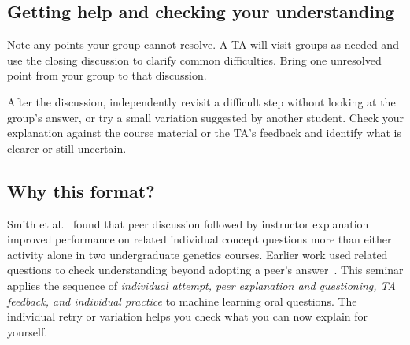 \documentclass[11pt,a4paper]{article}
\begin{document}
\subsection*{Getting help and checking your understanding}
Note any points your group cannot resolve. A TA will visit groups as needed and use the closing discussion to clarify common difficulties. Bring one unresolved point from your group to that discussion.

After the discussion, independently revisit a difficult step without looking at the group's answer, or try a small variation suggested by another student. Check your explanation against the course material or the TA's feedback and identify what is clearer or still uncertain.

\subsection*{Why this format?}
Smith et al.~\cite{smith2011} found that peer discussion followed by instructor explanation improved performance on related individual concept questions more than either activity alone in two undergraduate genetics courses. Earlier work used related questions to check understanding beyond adopting a peer's answer~\cite{smith2009}. This seminar applies the sequence of \emph{individual attempt, peer explanation and questioning, TA feedback, and individual practice} to machine learning oral questions. The individual retry or variation helps you check what you can now explain for yourself.

{\small


}
\end{document}
